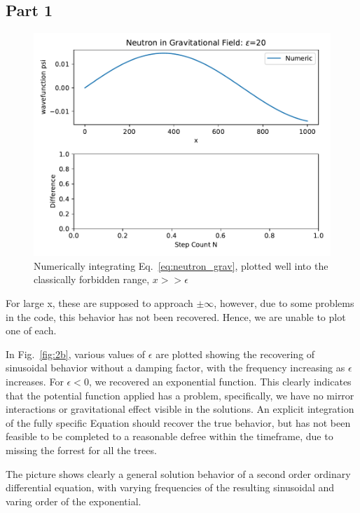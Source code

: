 \documentclass[12pt,a4paper,twoside]{article}
\begin{document}
\subsection*{Part 1}

\begin{figure}[h!]
  \centering
  \includegraphics[width=.9\textwidth]{../exercise4_problem2_numIntegration.pdf}
  \caption{Numerically integrating Eq.~\ref{eq:neutron_grav}, plotted well into the 
            classically forbidden range, $x >> \epsilon$}
  \label{fig:2a}
\end{figure}

For large x, these are supposed to approach $\pm \infty$, however, due to some 
problems in the code, this behavior has not been recovered. Hence, we are unable
to plot one of each. 

In Fig.~\ref{fig:2b}, various values of $\epsilon$ are plotted
showing the recovering of sinusoidal behavior without a damping factor, with the
frequency increasing as $\epsilon$ increases. For $\epsilon<0$, we recovered 
an exponential function. This clearly indicates that the potential function applied
has a problem, specifically, we have no mirror interactions or gravitational effect
visible in the solutions. An explicit integration of the fully specific Equation 
should recover the true behavior, but has not been feasible to be completed to a 
reasonable defree within the timeframe, due to missing the forrest for all the trees.

The picture shows clearly a general solution behavior of a second order ordinary
differential equation, with varying frequencies of the resulting sinusoidal and 
varing order of the exponential.
\end{document}

